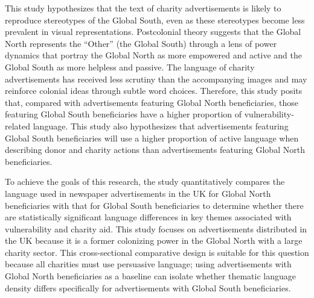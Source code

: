 This study hypothesizes that the text of charity advertisements is likely to reproduce stereotypes of the Global South, even as these stereotypes become less prevalent in visual representations. Postcolonial theory suggests that the Global North represents the “Other” (the Global South) through a lens of power dynamics that portray the Global North as more empowered and active and the Global South as more helpless and passive. The language of charity advertisements has received less scrutiny than the accompanying images and may reinforce colonial ideas through subtle word choices. Therefore, this study posits that, compared with advertisements featuring Global North beneficiaries, those featuring Global South beneficiaries have a higher proportion of vulnerability-related language. This study also hypothesizes that advertisements featuring Global South beneficiaries will use a higher proportion of active language when describing donor and charity actions than advertisements featuring Global North beneficiaries.

To achieve the goals of this research, the study quantitatively compares the language used in newspaper advertisements in the UK for Global North beneficiaries with that for Global South beneficiaries to determine whether there are statistically significant language differences in key themes associated with vulnerability and charity aid. This study focuses on advertisements distributed in the UK because it is a former colonizing power in the Global North with a large charity sector. This cross-sectional comparative design is suitable for this question because all charities must use persuasive language; using advertisements with Global North beneficiaries as a baseline can isolate whether thematic language density differs specifically for advertisements with Global South beneficiaries.
